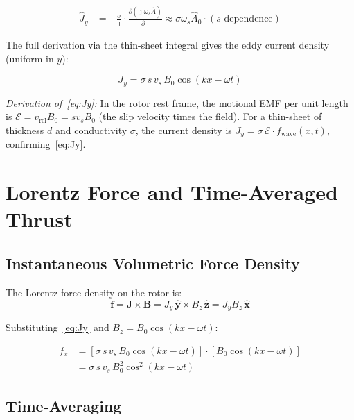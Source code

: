 \documentclass[12pt, a4paper]{article}
\theoremstyle{plain}
\theoremstyle{definition}
\newcommand{\vB}{\mathbf{B}}
\newcommand{\vJ}{\mathbf{J}}
\newcommand{\xhat}{\hat{\mathbf{x}}}
\newcommand{\yhat}{\hat{\mathbf{y}}}
\newcommand{\zhat}{\hat{\mathbf{z}}}
\newcommand{\oms}{\omega_s}
\newcommand{\sig}{\sigma}
\begin{document}
\begin{align}
  \hat{J}_y &= -\frac{\sig}{\jmath}\cdot\frac{\partial(\jmath\oms\hat{A})}{\partial \cdot}
              \approx \sig\oms\hat{A}_0 \cdot (s \text{ dependence})
\end{align}

The full derivation via the thin-sheet integral gives the eddy current density
(uniform in $y$):

\begin{tcolorbox}[colback=yellow!10, colframe=orange!60]
\begin{equation}
  \boxed{J_y = \sig\, s\, v_s\, B_0 \cos(kx - \omega t)}
  \label{eq:Jy}
\end{equation}
\end{tcolorbox}

\noindent\textit{Derivation of~\eqref{eq:Jy}:} In the rotor rest frame, the
motional EMF per unit length is $\mathcal{E} = v_{\mathrm{rel}}B_0 = sv_sB_0$
(the slip velocity times the field). For a thin-sheet of thickness $d$ and
conductivity $\sig$, the current density is
$J_y = \sig\,\mathcal{E} \cdot f_{\mathrm{wave}}(x,t)$, confirming~\eqref{eq:Jy}.

\section{Lorentz Force and Time-Averaged Thrust}
\label{sec:lorentz}

\subsection{Instantaneous Volumetric Force Density}

The Lorentz force density on the rotor is:
\begin{equation}
  \mathbf{f} = \vJ \times \vB = J_y\,\yhat \times B_z\,\zhat = J_y B_z\,\xhat
\end{equation}

Substituting~\eqref{eq:Jy} and $B_z = B_0\cos(kx-\omega t)$:

\begin{align}
  f_x &= \left[\sig\, s\, v_s\, B_0\cos(kx-\omega t)\right]
         \cdot \left[B_0\cos(kx-\omega t)\right] \nonumber\\
      &= \sig\, s\, v_s\, B_0^2\cos^2(kx-\omega t)
  \label{eq:fx_inst}
\end{align}

\subsection{Time-Averaging}
\end{document}
